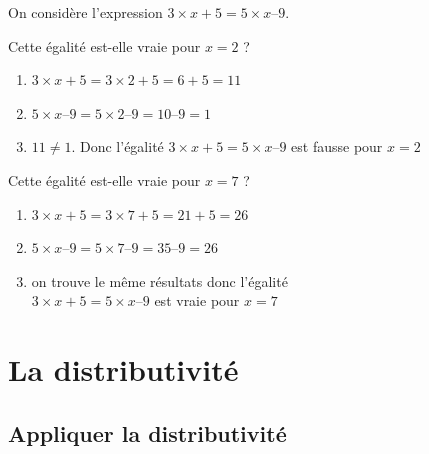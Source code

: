 \documentclass[a4paper,10pt]{report}
\begin{document}
\begin{ex}
On considère l'expression $3 \times x + 5 = 5 \times x – 9$.

\medskip
\noindent \begin{minipage}{8cm}
Cette égalité est-elle vraie pour $x = 2$ ?
\begin{enumerate}
\item $3 \times x + 5 = 3 \times 2 + 5 = 6 + 5 = 11$
\item $5 \times x – 9 = 5 \times 2 – 9 = 10 – 9 = 1$
\item $11 \neq 1$. Donc l'égalité $3 \times x + 5 = 5 \times x – 9$ est fausse pour $x = 2$
\end{enumerate}
\end{minipage}
\hspace{5mm}\vline\hspace{5mm}
\begin{minipage}{8cm}
Cette égalité est-elle vraie pour $x = 7$ ?
\begin{enumerate}
\item $3 \times x + 5 = 3 \times 7 + 5 = 21 + 5 = 26$
\item $5 \times x – 9 = 5 \times 7 – 9 = 35 – 9 = 26$
\item on trouve le même résultats donc l'égalité \\ $3 \times x + 5 = 5 \times x – 9$ est vraie pour $x = 7$
\end{enumerate}
\end{minipage}
\end{ex}

\newpage
\section{La distributivité}

\subsection{Appliquer la distributivité}
\end{document}
